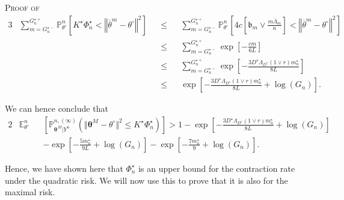 \begin{pro}{\textsc{Proof of } \\}
\begin{alignat*}{3}
& \sum\limits_{m = G_{n}^{\star-}}^{G_{n}^{\star+}} \mathds{P}_{\theta^{\circ}}^{n}\left[K^{\star} \Phi_{n}^{\star} < \left\Vert \overline{\theta}^{m} - \theta^{\circ} \right\Vert^{2}\right] && \leq && \sum\limits_{m = G_{n}^{\star-}}^{G_{n}^{\star+}} \mathds{P}_{\theta^{\circ}}^{n}\left[ 4c \left[\mathfrak{b}_{m} \vee \frac{m \overline{\Lambda}_{m}}{n}\right] < \left\Vert \overline{\theta}^{m} - \theta^{\circ} \right\Vert^{2}\right]\\
& && \leq && \sum\limits_{m = G_{n}^{\star-}}^{G_{n}^{\star+}} \exp\left[-\frac{c m}{6 L}\right]\\
& && \leq && \sum\limits_{m = G_{n}^{\star-}}^{G_{n}^{\star+}} \exp\left[-\frac{3 D^{\star} \Lambda_{D^{\star}} \left(1 \vee r\right) m_{n}^{\star}}{8 L}\right] \\
& && \leq && \exp\left[-\frac{3 D^{\star} \Lambda_{D^{\star}} \left(1 \vee r \right) m_{n}^{\star}}{ 8L} + \log\left(G_{n}\right)\right].
\end{alignat*}

We can hence conclude that
\begin{alignat*}{2}
& \mathds{E}_{\theta^{\circ}}^{n}&&\left[\mathds{P}_{\boldsymbol{\theta}^{M}\vert Y^{n}}^{n, (\infty)}\left(\Vert \boldsymbol{\theta}^{M} - \theta^{\circ} \Vert ^{2} \leq K^{\star} \Phi_{n}^{\star}\right)\right] > 1 - \exp\left[-\frac{3 D^{\star} \Lambda_{D^{\star}} \left(1 \vee r\right) m_{n}^{\star}}{8 L} + \log\left(G_{n}\right)\right]\\
& &&- \exp\left[- \frac{5 m_{n}^{\star}}{9 L} + \log\left(G_{n}\right)\right] - \exp\left[- \frac{7 m_{n}^{\star}}{9} + \log\left(G_{n}\right)\right].
\end{alignat*}


Hence, we have shown here that $\Phi_{n}^{\star}$ is an upper bound for the contraction rate under the quadratic risk.
We will now use this to prove that it is also for the maximal risk.

\medskip


\end{pro}

